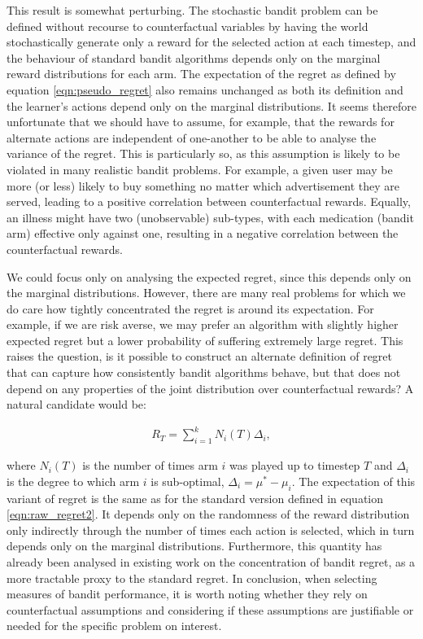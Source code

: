 \documentclass[11pt,a4paper,twoside]{report}
\newcommand{\eqn}[1]{\begin{align}#1\end{align}}
\theoremstyle{plain}
\theoremstyle{definition}
\begin{document}
This result is somewhat perturbing. The stochastic bandit problem can be defined without recourse to counterfactual variables by having the world stochastically generate only a reward for the selected action at each timestep, and the behaviour of standard bandit algorithms depends only on the marginal reward distributions for each arm. The expectation of the regret as defined by equation \ref{eqn:pseudo_regret} also remains unchanged as both its definition and the learner's actions depend only on the marginal distributions. It seems therefore unfortunate that we should have to assume, for example, that the rewards for alternate actions are independent of one-another to be able to analyse the variance of the regret. This is particularly so, as this assumption is likely to be violated in many realistic bandit problems. For example, a given user may be more (or less) likely to buy something no matter which advertisement they are served, leading to a positive correlation between counterfactual rewards. Equally, an illness might have two (unobservable) sub-types, with each medication (bandit arm) effective only against one, resulting in a negative correlation between the counterfactual rewards. 

We could focus only on analysing the expected regret, since this depends only on the marginal distributions. However, there are many real problems for which we do care how tightly concentrated the regret is around its expectation. For example, if we are risk averse, we may prefer an algorithm with slightly higher expected regret but a lower probability of suffering extremely large regret. This raises the question, is it possible to construct an alternate definition of regret that can capture how consistently bandit algorithms behave, but that does not depend on any properties of the joint distribution over counterfactual rewards? A natural candidate would be:

\eqn{
R_T = \sum_{i=1}^k N_i(T)\Delta_i, 
}

where $N_i(T)$ is the number of times arm $i$ was played up to timestep $T$ and $\Delta_i$ is the degree to which arm $i$ is sub-optimal, $\Delta_i = \mu^* - \mu_i$. The expectation of this variant of regret is the same as for the standard version defined in equation \ref{eqn:raw_regret2}. It depends only on the randomness of the reward distribution only indirectly through the number of times each action is selected, which in turn depends only on the marginal distributions. Furthermore, this quantity has already been analysed in existing work on the concentration of bandit regret, \citep{Audibert2007,Audibert2009exploration} as a more tractable proxy to the standard regret. In conclusion, when selecting measures of bandit performance, it is worth noting whether they rely on counterfactual assumptions and considering if these assumptions are justifiable or needed for the specific problem on interest.
\end{document}
